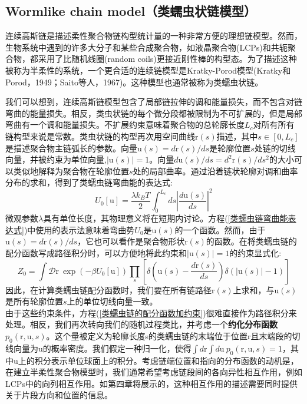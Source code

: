 \subsection{Wormlike chain model（类蠕虫状链模型）}

连续高斯链是描述柔性聚合物链构型统计量的一种非常方便的理想链模型。然而，生物系统中遇到的许多大分子和某些合成聚合物，如液晶聚合物(LCPs)和共轭聚合物，都采用了比随机线圈(random coils)更接近刚性棒的构型态。为了描述这种被称为半柔性的系统，一个更合适的连续链模型是Kratky-Porod模型(Kratky和Porod，1949；Saito等人，1967)。这种模型也通常被称为类蠕虫状链。

我们可以想到，连续高斯链模型包含了局部链拉伸的调和能量损失，而不包含对链弯曲的能量损失。相反，类虫状链的每个微分段都被限制为不可扩展的，但是局部弯曲有一个调和能量损失。不扩展约束意味着聚合物的总轮廓长度$L_c$对所有所有链构型来说是常数。类虫状链的构型再次用空间曲线$\mathrm{r}(s)$描述，其中$s\in [0,L_c]$是描述聚合物主链弧长的参数。向量$\mathrm{u}(s)=d\mathrm{r}(s)/ds$是轮廓位置$s$处链的切线向量，并被约束为单位向量,$|\mathrm{u}(s)| =1$。向量$d\mathrm{u}(s)/ds=d^2\mathrm{r}(s)/ds^2$的大小可以类似地解释为聚合物在轮廓位置$s$处的局部曲率。通过沿着链状轮廓对调和曲率分布的求和，得到了类蠕虫链弯曲能的表达式:\\
\begin{equation}
	U_0[\mathrm{u}]=\frac{\lambda k_B T}{2}\int_{0}^{L_c}ds|\frac{d\mathrm{u}(s)}{ds}|^2 \label{类蠕虫链弯曲能表达式}
\end{equation}
微观参数$\lambda$具有单位长度，其物理意义将在短期内讨论。方程(\ref{类蠕虫链弯曲能表达式})中使用的表示法意味着弯曲势$U_0$是$\mathrm{u}(s)$的一个函数。然而，由于$\mathrm{u}(s)=d\mathrm{r}(s)/ds$，它也可以看作是聚合物形状$\mathrm{r}(s)$的函数。在将类蠕虫链的配分函数写成路径积分时，可以方便地将此约束和$|\mathrm{u}(s)|=1$的约束显式化:\\
\begin{equation}
	Z_0=\int \mathcal{D} \mathrm{r}\ \exp (-\beta U_0[\mathrm{u}])\prod_s\left[\delta\left(\mathrm{u}(s)-\frac{d\mathrm{r}(s)}{ds}\right)\delta(|\mathrm{u}(s)|-1)\right]\label{类蠕虫链的配分函数加约束}
\end{equation}
因此，在计算类蠕虫链配分函数时，我们要在所有链路径$\mathrm{r}(s)$上求和，与$\mathrm{u}(s)$是所有轮廓位置$s$上的单位切线向量一致。\\

由于这些约束条件，方程(\ref{类蠕虫链的配分函数加约束})很难直接作为路径积分来处理。相反，我们再次转向我们的随机过程类比，并考虑一个\textbf{约化分布函数}$p_0(\mathrm{r},\mathrm{u},s)$。这个量被定义为轮廓长度s的类蠕虫链的末端位于位置$\mathrm{r}$且末端段的切线向量为$\mathrm{u}$的概率密度。我们假定一种归一化，使得$\int d\mathrm{r}\int d\mathrm{u} \ p_0(\mathrm{r},\mathrm{u},s)=1$，其中$\mathrm{u}$上的积分表示单位球面上的积分。考虑链端位置和指向的分布函数的动机是，在建立半柔性聚合物模型时，我们通常希望考虑链段间的各向异性相互作用，例如LCPs中的向列相互作用。如第四章将展示的，这种相互作用的描述需要同时提供关于片段方向和位置的信息。

